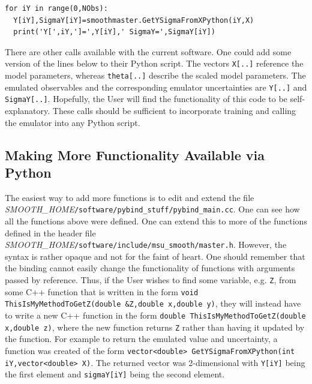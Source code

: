\documentclass[UserManual.tex]{subfiles}
\begin{document}
\begin{sloppypar}
{\begin{Verbatim}[commandchars=\\\{\}]
for iY in range(0,NObs):
  Y[iY],SigmaY[iY]=smoothmaster.GetYSigmaFromXPython(iY,X)
  print('Y[',iY,']=',Y[iY],' SigmaY=',SigmaY[iY])
\end{Verbatim}
}\vspace*{-8pt}
There are other calls available with the current software. One could add some version of the lines below to their Python script.
\vspace*{-8pt}{\tt
\begin{Verbatim}[commandchars=\\\{\}]
theta=smoothmaster.GetThetaFromX(X)
X=smoothmaster.GetXFromTheta(theta)
Y[iY],SigmaY[iY]=smoothmaster.GetYSigmaFromThetaPython(iY,theta)
Y[iY]=smoothmaster.GetYOnlyFromXPython(iY,X)
Y[iY]=smoothmaster.GetYOnlyFromThetaPython(iY,theta)
\end{Verbatim}
}\vspace*{-8pt}
The vectors {\tt X[..]} reference the model parameters, whereas {\tt theta[..]} describe the scaled model parameters. The emulated observables and the corresponding emulator uncertainties are {\tt Y[..]} and {\tt SigmaY[..]}. Hopefully, the User will find the functionality of this code to be self-explanatory. These calls should be sufficient to incorporate training and calling the emulator into any Python script.

\subsection{Making More Functionality Available via Python}
The easiest way to add more functions is to edit and extend the file \textit{SMOOTH\_HOME}{\tt /software/pybind\_stuff/pybind\_main.cc}. One can see how all the functions above were defined. One can extend this to more of the functions defined in the header file \textit{SMOOTH\_HOME}{\tt /software/include/msu\_smooth/master.h}. However, the syntax is rather opaque and not for the faint of heart. One should remember that the binding cannot easily change the functionality of functions with arguments passed by reference. Thus, if the User wishes to find some variable, e.g. {\tt Z}, from some C++ function that is written in the form {\tt void ThisIsMyMethodToGetZ(double \&Z,double x,double y)}, they will instead have to write a new C++ function in the form {\tt double ThisIsMyMethodToGetZ(double x,double z)}, where the new function returns {\tt Z} rather than having it updated by the function. For example to return the emulated value and uncertainty, a function was created of the form {\tt vector<double> GetYSigmaFromXPython(int iY,vector<double> X)}. The returned vector was 2-dimensional with {\tt Y[iY]} being the first element and {\tt sigmaY[iY]} being the second element.

\end{sloppypar}
\end{document}
